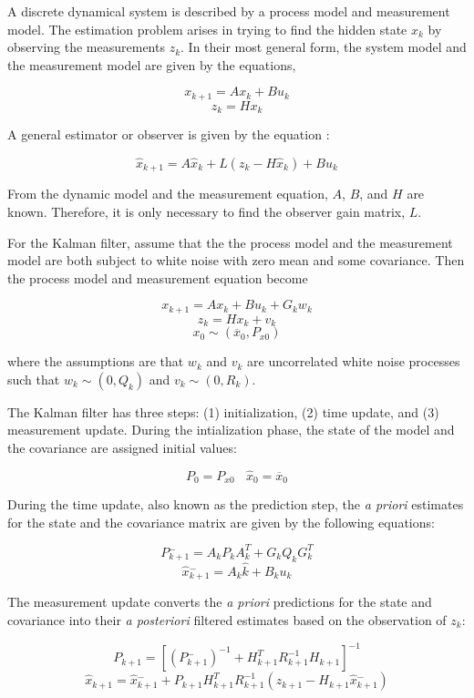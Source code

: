 \documentclass{article}
\begin{document}
\begin{flushleft}
A discrete dynamical system is described by a process model and measurement model. The estimation problem arises in trying to find the hidden state $x_k$ by observing the measurements $z_k$. In their most general form, the system model and the measurement model are given by the equations, 

\[ x_{k+1} = A x_k + B u_k \]
\[ z_k = H x_k \]

A general estimator or observer is given by the equation \cite{Lewis2007}: 

\[ \hat{x}_{k+1} = A \hat{x}_k + L (z_k - H \hat{x}_k) + B u_k \]

From the dynamic model and the measurement equation, $A$, $B$, and $H$ are known. Therefore, it is only necessary to find the observer gain matrix, $L$. 

\medskip

For the Kalman filter, assume that the the process model and the measurement model are both subject to white noise with zero mean and some covariance. Then the process model and measurement equation become 

\[ x_{k+1} = A x_k + B u_k + G_k w_k \]
\[ z_k = H x_k + v_k \]
\[ x_0 \sim (\overline{x}_0, P_{x0}) \]

where the assumptions are that {$w_k$} and {$v_k$} are uncorrelated white noise processes such that $w_k \sim (0, Q_k)$ and $v_k \sim (0,R_k)$. 

\medskip

The Kalman filter has three steps: (1) initialization, (2) time update, and (3) measurement update. During the intialization phase, the state of the model and the covariance are assigned initial values: 

\[ P_0 = P_{x0}  \ \ \ \  \hat{x}_0 = \overline{x}_0 \]

During the time update, also known as the prediction step, the \textit{a priori} estimates for the state and the covariance matrix are given by the following equations: 

$$ P{^{-}_{k+1}} = A_k P_k A_k^{T} + G_k Q_k G_k^{T} $$
$$ \hat{x}{^{-}_{k+1}} = A_k \hat{k} + B_k u_k $$

The measurement update converts the \textit{a priori} predictions for the state and covariance into their \textit{a posteriori} filtered estimates based on the observation of $z_k$: 

$$ P_{k+1} = [ (P{^{-}_{k+1}})^{-1} + H_{k+1}^{T} R_{k+1}^{-1} H_{k+1} ]^{-1} $$
$$ \hat{x}_{k+1} = \hat{x}{^{-}_{k+1}} + P_{k+1} H_{k+1}^{T} R_{k+1}^{-1} (z_{k+1} - H_{k+1} \hat{x}{^{-}_{k+1}}) $$


\end{flushleft}
\end{document}
